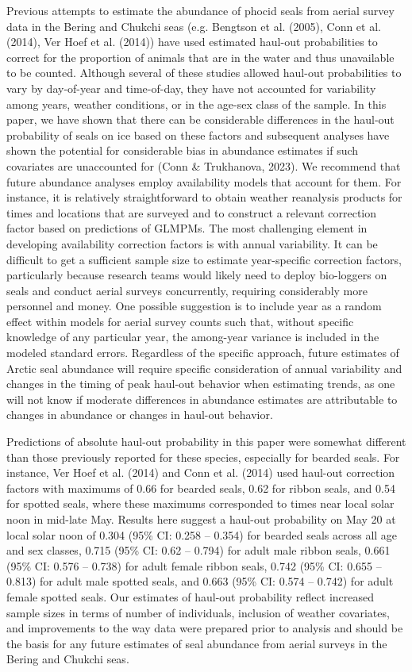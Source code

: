 \documentclass[fleqn,10pt,lineno]{wlpeerj} %
\begin{document}
Previous attempts to estimate the abundance of phocid seals from aerial survey
data in the Bering and Chukchi seas (e.g. Bengtson et al. (2005), Conn et al. (2014),
Ver Hoef et al. (2014)) have used estimated haul-out probabilities to correct for the
proportion of animals that are in the water and thus unavailable to be counted.
Although several of these studies allowed haul-out probabilities to vary by
day-of-year and time-of-day, they have not accounted for variability among
years, weather conditions, or in the age-sex class of the sample. In this paper,
we have shown that there can be considerable differences in the haul-out
probability of seals on ice based on these factors and subsequent analyses have
shown the potential for considerable bias in abundance estimates if such
covariates are unaccounted for (Conn \& Trukhanova, 2023). We recommend that future abundance
analyses employ availability models that account for them. For instance, it is
relatively straightforward to obtain weather reanalysis products for times and
locations that are surveyed and to construct a relevant correction factor based
on predictions of GLMPMs. The most challenging element in developing
availability correction factors is with annual variability. It can be difficult
to get a sufficient sample size to estimate year-specific correction factors,
particularly because research teams would likely need to deploy bio-loggers on
seals and conduct aerial surveys concurrently, requiring considerably more
personnel and money. One possible suggestion is to include year as a random
effect within models for aerial survey counts such that, without specific
knowledge of any particular year, the among-year variance is included in the
modeled standard errors. Regardless of the specific approach, future estimates
of Arctic seal abundance will require specific consideration of annual
variability and changes in the timing of peak haul-out behavior when estimating
trends, as one will not know if moderate differences in abundance estimates are
attributable to changes in abundance or changes in haul-out behavior.

Predictions of absolute haul-out probability in this paper were somewhat
different than those previously reported for these species, especially for
bearded seals. For instance, Ver Hoef et al. (2014) and Conn et al.
(2014) used haul-out correction factors with maximums of 0.66 for bearded
seals, 0.62 for ribbon seals, and 0.54 for spotted seals, where these maximums
corresponded to times near local solar noon in mid-late May. Results here
suggest a haul-out probability on May 20 at local solar noon of 0.304
(95\% CI: 0.258 -- 0.354)
for bearded seals across all age and sex classes,
0.715
(95\% CI: 0.62 -- 0.794) for
adult male ribbon seals, 0.661
(95\% CI: 0.576 -- 0.738) for
adult female ribbon seals, 0.742
(95\% CI: 0.655 -- 0.813) for
adult male spotted seals, and 0.663
(95\% CI: 0.574 -- 0.742) for
adult female spotted seals. Our estimates
of haul-out probability reflect increased sample sizes in terms of
number of individuals, inclusion of weather covariates, and improvements to the
way data were prepared prior to analysis and should be the basis for any
future estimates of seal abundance from aerial surveys in the Bering and
Chukchi seas.
\end{document}
